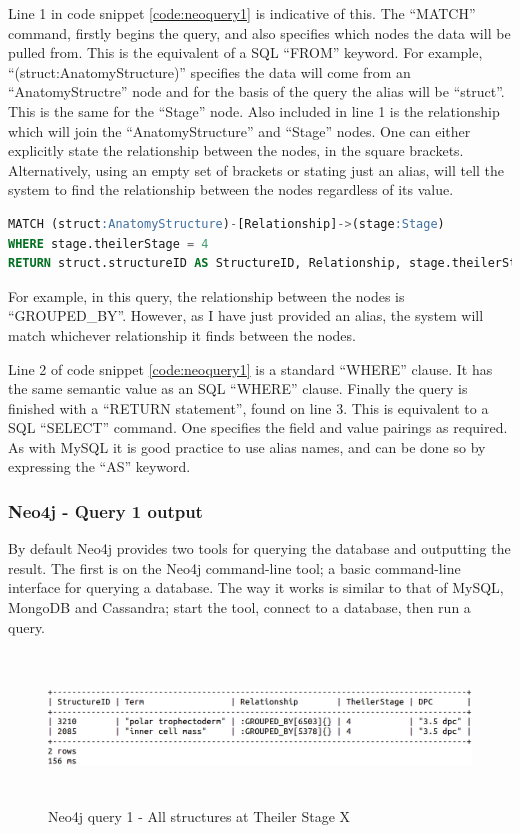 Line 1 in code snippet \ref{code:neoquery1} is indicative of this. The ``MATCH'' command, firstly begins the query, and also specifies which nodes the data will be pulled from. This is the equivalent of a SQL ``FROM'' keyword. For example, ``(struct:AnatomyStructure)'' specifies the data will come from an ``AnatomyStructre'' node and for the basis of the query the alias will be ``struct''. This is the same for the ``Stage'' node. Also included in line 1 is the relationship which will join the ``AnatomyStructure'' and ``Stage'' nodes. One can either explicitly state the relationship between the nodes, in the square brackets. Alternatively, using an empty set of brackets or stating just an alias, will tell the system to find the relationship between the nodes regardless of its value.
\begin{lstlisting}[language=SQL, caption=Neo4j Query 1 statement. All structures at Theiler Stage 4, label=code:neoquery1]
MATCH (struct:AnatomyStructure)-[Relationship]->(stage:Stage)
WHERE stage.theilerStage = 4
RETURN struct.structureID AS StructureID, Relationship, stage.theilerStage AS TheilerStage, stage.dpc AS DPC;
\end{lstlisting}
\parindent 0pt
For example, in this query, the relationship between the nodes is ``GROUPED\_BY''. However, as I have just provided an alias, the system will match whichever relationship it finds between the nodes.

\parindent 15pt
Line 2 of code snippet \ref{code:neoquery1} is a standard ``WHERE'' clause. It has the same semantic value as an SQL ``WHERE'' clause. Finally the query is finished with a ``RETURN statement'', found on line 3. This is equivalent to a SQL ``SELECT'' command. One specifies the field and value pairings as required. As with MySQL it is good practice to use alias names, and can be done so by expressing the ``AS'' keyword.

\subsubsection*{Neo4j - Query 1 output}\label{neoquery1output}
By default Neo4j provides two tools for querying the database and outputting the result. The first is on the Neo4j command-line tool; a basic command-line interface for querying a database. The way it works is similar to that of MySQL, MongoDB and Cassandra; start the tool, connect to a database, then run a query.

\begin{figure}[H]\begin{center}\includegraphics[height=4cm,width=0.9\linewidth]{images/neo4jquery1terminal}\caption{Neo4j query 1 - All structures at Theiler Stage X}\label{fig:neo4jquery1terminal}\end{center}\end{figure}

